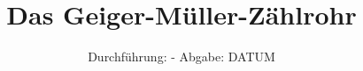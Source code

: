 

\subject{V.703}
\title{Das Geiger-Müller-Zählrohr}
\date{%
  Durchführung: -
  \hspace{3em}
  Abgabe: DATUM
}



\maketitle
\thispagestyle{empty}
\tableofcontents
\newpage







\printbibliography{}
\nocite{*}


